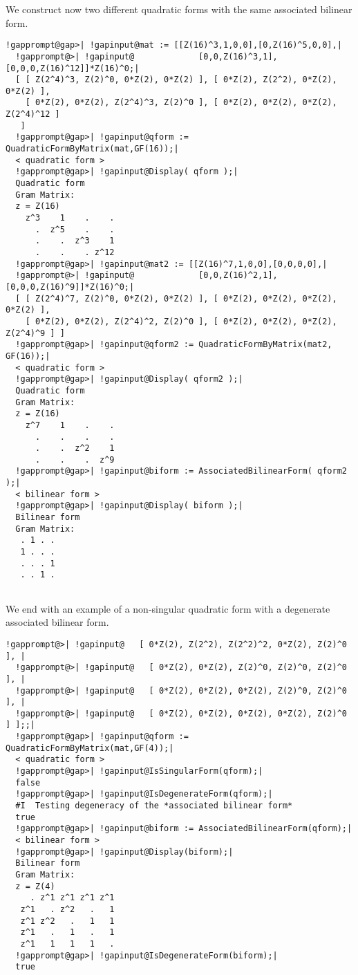 \documentclass[a4paper,11pt]{report}
\begin{document}
{{{\begin{Verbatim}[commandchars=!@|,fontsize=\small,frame=single,label=Example]
\end{Verbatim}
 We construct now two different quadratic forms with the same associated
bilinear form. 
\begin{Verbatim}[commandchars=!@|,fontsize=\small,frame=single,label=Example]
  !gapprompt@gap>| !gapinput@mat := [[Z(16)^3,1,0,0],[0,Z(16)^5,0,0],|
  !gapprompt@>| !gapinput@             [0,0,Z(16)^3,1],[0,0,0,Z(16)^12]]*Z(16)^0;|
  [ [ Z(2^4)^3, Z(2)^0, 0*Z(2), 0*Z(2) ], [ 0*Z(2), Z(2^2), 0*Z(2), 0*Z(2) ], 
    [ 0*Z(2), 0*Z(2), Z(2^4)^3, Z(2)^0 ], [ 0*Z(2), 0*Z(2), 0*Z(2), Z(2^4)^12 ] 
   ]
  !gapprompt@gap>| !gapinput@qform := QuadraticFormByMatrix(mat,GF(16));|
  < quadratic form >
  !gapprompt@gap>| !gapinput@Display( qform );|
  Quadratic form
  Gram Matrix:
  z = Z(16)
    z^3    1    .    .
      .  z^5    .    .
      .    .  z^3    1
      .    .    . z^12
  !gapprompt@gap>| !gapinput@mat2 := [[Z(16)^7,1,0,0],[0,0,0,0],|
  !gapprompt@>| !gapinput@             [0,0,Z(16)^2,1],[0,0,0,Z(16)^9]]*Z(16)^0;|
  [ [ Z(2^4)^7, Z(2)^0, 0*Z(2), 0*Z(2) ], [ 0*Z(2), 0*Z(2), 0*Z(2), 0*Z(2) ], 
    [ 0*Z(2), 0*Z(2), Z(2^4)^2, Z(2)^0 ], [ 0*Z(2), 0*Z(2), 0*Z(2), Z(2^4)^9 ] ]
  !gapprompt@gap>| !gapinput@qform2 := QuadraticFormByMatrix(mat2, GF(16));|
  < quadratic form >
  !gapprompt@gap>| !gapinput@Display( qform2 );|
  Quadratic form
  Gram Matrix:
  z = Z(16)
    z^7    1    .    .
      .    .    .    .
      .    .  z^2    1
      .    .    .  z^9
  !gapprompt@gap>| !gapinput@biform := AssociatedBilinearForm( qform2 );|
  < bilinear form >
  !gapprompt@gap>| !gapinput@Display( biform );|
  Bilinear form
  Gram Matrix:
   . 1 . .
   1 . . .
   . . . 1
   . . 1 .
   
\end{Verbatim}
 We end with an example of a non-singular quadratic form with a degenerate
associated bilinear form. 
\begin{Verbatim}[commandchars=!@|,fontsize=\small,frame=single,label=Example]
  !gapprompt@>| !gapinput@   [ 0*Z(2), Z(2^2), Z(2^2)^2, 0*Z(2), Z(2)^0 ], |
  !gapprompt@>| !gapinput@   [ 0*Z(2), 0*Z(2), Z(2)^0, Z(2)^0, Z(2)^0 ], |
  !gapprompt@>| !gapinput@   [ 0*Z(2), 0*Z(2), 0*Z(2), Z(2)^0, Z(2)^0 ], |
  !gapprompt@>| !gapinput@   [ 0*Z(2), 0*Z(2), 0*Z(2), 0*Z(2), Z(2)^0 ] ];;|
  !gapprompt@gap>| !gapinput@qform := QuadraticFormByMatrix(mat,GF(4));|
  < quadratic form >
  !gapprompt@gap>| !gapinput@IsSingularForm(qform);|
  false
  !gapprompt@gap>| !gapinput@IsDegenerateForm(qform);|
  #I  Testing degeneracy of the *associated bilinear form*
  true
  !gapprompt@gap>| !gapinput@biform := AssociatedBilinearForm(qform);|
  < bilinear form >
  !gapprompt@gap>| !gapinput@Display(biform);|
  Bilinear form
  Gram Matrix:
  z = Z(4)
     . z^1 z^1 z^1 z^1
   z^1   . z^2   .   1
   z^1 z^2   .   1   1
   z^1   .   1   .   1
   z^1   1   1   1   .
  !gapprompt@gap>| !gapinput@IsDegenerateForm(biform);|
  true
   
\end{Verbatim}
 }

 }

 }
\end{document}
